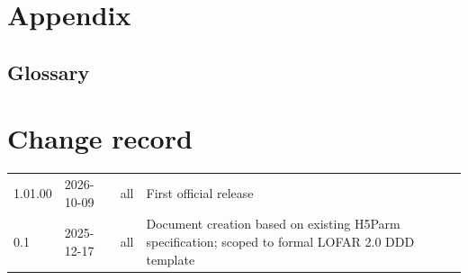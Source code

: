 \documentclass[a4paper,10pt,bibtotoc]{scrartcl}
\begin{document}


\clearpage

\appendix
\section{Appendix}

\subsection{Glossary}
\label{sec:glossary}


    


\section*{Change record}

\begin{center}
  \tablelasttail{\hline}
  \begin{supertabular}{lllp{10cm}}
    1.01.00 & 2026-10-09 & all & First official release \\  
    0.1 & 2025-12-17 & all & Document creation based on existing H5Parm specification; scoped to formal LOFAR 2.0 DDD template \\
\end{supertabular}
\end{center}
\end{document}
